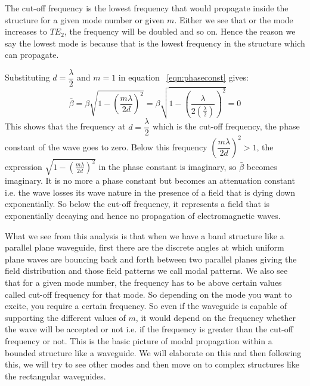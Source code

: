 The cut-off frequency is the lowest frequency that would propagate inside the structure for a given mode number or given $m$. Either we see that or the mode increases to $TE_2$, the frequency will be doubled and so on. Hence the reason we say the lowest mode is because that is the lowest frequency in the structure which can propagate.

Substituting $d=\dfrac{\lambda}{2}$ and $m=1$ in equation ~\ref{eqn:phaseconst} gives:
\begin{dmath*}
\bar{\beta} = \beta\sqrt{1 - \left(\frac{m\lambda}{2d}\right)^2} =  \beta\sqrt{1 - \left(\frac{\lambda}{2\left(\frac{\lambda}{2}\right)}\right)^2} = 0
\end{dmath*}
This shows that the frequency at $d=\dfrac{\lambda}{2}$ which is the cut-off frequency, the phase constant of the wave goes to zero. Below this frequency $\left(\dfrac{m\lambda}{2d}\right)^2 > 1$, the expression $\sqrt{1 - \left(\frac{m\lambda}{2d}\right)^2}$ in the phase constant is imaginary, so $\bar{\beta}$ becomes imaginary. It is no more a phase constant but becomes an attenuation constant i.e. the wave losses its wave nature in the presence of a field that is dying down exponentially. So below the cut-off frequency, it represents a field that is exponentially decaying and hence no propagation of electromagnetic waves.

What we see from this analysis is that when we have a band structure like a parallel plane waveguide, first there are the discrete angles at which uniform plane waves are bouncing back and forth between two parallel planes giving the field distribution and those field patterns we call modal patterns. We also see that for a given mode number, the frequency has to be above certain values called cut-off frequency for that mode. So depending on the mode you want to excite, you require a certain frequency. So even if the waveguide is capable of supporting the different values of $m$, it would depend on the frequency whether the wave will be accepted or not i.e. if the frequency is greater than the cut-off frequency or not. This is the basic picture of modal propagation within a bounded structure like a waveguide. We will elaborate on this and then following this, we will try to see other modes and then move on to complex structures like the rectangular waveguides.

